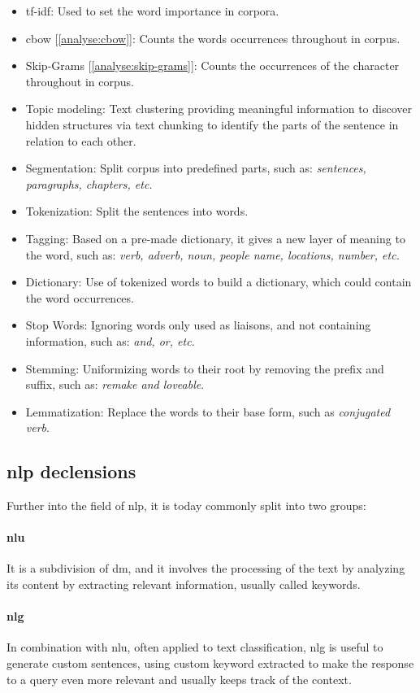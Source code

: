 \begin{itemize}
    \setlength\itemsep{0em}
    \item \gls{tf-idf}: Used to set the word importance in corpora.
    \item \gls{cbow} [\ref{analyse:cbow}]: Counts the words occurrences throughout in corpus.
    \item Skip-Grams [\ref{analyse:skip-grams}]: Counts the occurrences of the character throughout in corpus.
    \item Topic modeling: Text clustering providing meaningful information to discover hidden structures via text chunking to identify the parts of the sentence in relation to each other.
    \item Segmentation: Split corpus into predefined parts, such as: \textit{sentences, paragraphs, chapters, etc.}
    \item Tokenization: Split the sentences into words.
    \item Tagging: Based on a pre-made dictionary, it gives a new layer of meaning to the word, such as: \textit{verb, adverb, noun, people name, locations, number, etc.}
    \item Dictionary: Use of tokenized words to build a dictionary, which could contain the word occurrences.
    \item Stop Words: Ignoring words only used as liaisons, and not containing information, such as: \textit{and, or, etc.}
    \item Stemming: Uniformizing words to their root by removing the prefix and suffix, such as: \textit{remake and loveable}.
    \item Lemmatization: Replace the words to their base form, such as \textit{conjugated verb}.
\end{itemize}

\subsection{\gls{nlp} declensions}
Further into the field of \gls{nlp}, it is today commonly split into two groups:

\paragraph{\gls{nlu}}
It is a subdivision of \gls{dm}, and it involves the processing of the text by analyzing its content by extracting relevant information, usually called keywords.

\paragraph{\gls{nlg}}
In combination with \gls{nlu}, often applied to text classification, \gls{nlg} is useful to generate custom sentences, using custom keyword extracted to make the response to a query even more relevant and usually keeps track of the context.


